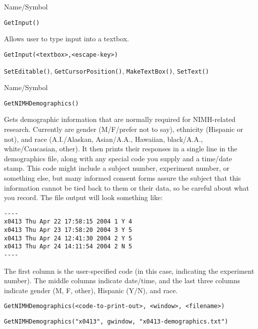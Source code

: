 \rl


\begin{desc}{Name/Symbol}
\item[Name/Symbol]	\verb+GetInput()+

\item[Description]	Allows user to type input into a textbox.

\item[Usage]
\begin{verbatim}
GetInput(<textbox>,<escape-key>)
\end{verbatim}

\item[Example]	

\item[See Also]	\verb+SetEditable()+, \verb+GetCursorPosition()+, \verb+MakeTextBox()+, \verb+SetText()+
\end{desc}

\rl



\begin{desc}{Name/Symbol}
\item[Name/Symbol]	\verb+GetNIMHDemographics()+

\item[Description]	Gets demographic information that are normally required for NIMH-related research.  Currently are gender (M/F/prefer not to say), ethnicity (Hispanic or not), and race (A.I./Alaskan, Asian/A.A., Hawaiian, black/A.A., white/Caucasian, other).  
		It then prints their responses in a single line in the demographics file, along with any special code you supply and a time/date stamp. This code might include a subject number, experiment number, or something else, but many informed consent forms assure the subject that this information cannot be tied back to them or their data, so be careful about what you record. The file output will look something like: 
\begin{verbatim}
---- 
x0413 Thu Apr 22 17:58:15 2004 1 Y 4 
x0413 Thu Apr 23 17:58:20 2004 3 Y 5 
x0413 Thu Apr 24 12:41:30 2004 2 Y 5 
x0413 Thu Apr 24 14:11:54 2004 2 N 5 
---- 
\end{verbatim}


	The first column is the user-specified code (in this 
	case, indicating the experiment number).  The middle columns 
	indicate date/time, and the last three columns indicate 
	gender (M, F, other), Hispanic (Y/N), and race.

\item[Usage]
\begin{verbatim}
GetNIMHDemographics(<code-to-print-out>, <window>, <filename>)
\end{verbatim} 

\item[Example]
\begin{verbatim}
GetNIMHDemographics("x0413", gwindow, "x0413-demographics.txt")
\end{verbatim}

\item[See Also]	
\end{desc}

